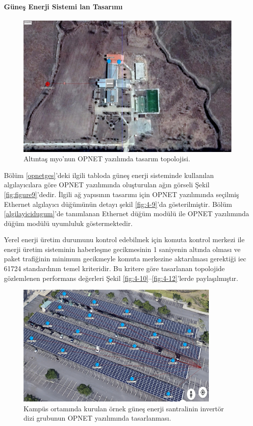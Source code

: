\paragraph{Güneş Enerji Sistemi \gls{lan} Tasarımı }

\begin{figure}[htbp]
\centerline{\includegraphics[width=\columnwidth]{Resim/Sekil4-7.jpg}}
\caption{Altıntaş \gls{myo}'nun OPNET yazılımda tasarım topolojisi.}
\label{fig:4-7}
\end{figure}

Bölüm \ref{opnetges}'deki ilgili tabloda güneş enerji sisteminde kullanılan algılayıcılara göre OPNET yazılımında oluşturulan ağın görseli Şekil \ref{fig:figure9}'dedir. İlgili ağ yapısının tasarımı için OPNET yazılımında seçilmiş Ethernet algılayıcı düğümünün detayı şekil \ref{fig:4-9}’da gösterilmiştir. Bölüm \ref{algilayicidugum}'de tanımlanan Ethernet düğüm modülü ile OPNET yazılımında düğüm modülü uyumluluk göstermektedir.

Yerel enerji üretim durumunu kontrol edebilmek için komuta kontrol merkezi ile enerji üretim sisteminin haberleşme gecikmesinin 1 saniyenin altında olması ve paket trafiğinin minimum gecikmeyle komuta merkezine aktarılması gerektiği \gls{iec} 61724 standardının temel kriteridir. Bu kritere göre tasarlanan topolojide gözlemlenen performans değerleri Şekil \ref{fig:4-10}--\ref{fig:4-12}’lerde paylaşılmıştır.


\begin{figure}[htbp]
\centerline{\includegraphics[width=10cm]{Resim/Sekil 4-8.png}}
\caption{Kampüs ortamında kurulan örnek güneş enerji santralinin invertör dizi grubunun OPNET yazılımında tasarlanması.}
\label{fig:4-8}
\end{figure}

